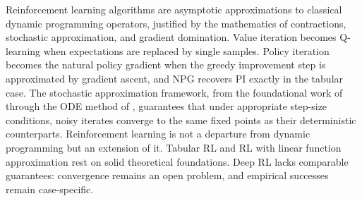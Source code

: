 Reinforcement learning algorithms are asymptotic approximations to classical dynamic programming operators, justified by the mathematics of contractions, stochastic approximation, and gradient domination. Value iteration becomes Q-learning \citep{WatkinsDayan1992, tsitsiklis1994} when expectations are replaced by single samples. Policy iteration becomes the natural policy gradient \citep{Kakade2001, agarwal2021theory} when the greedy improvement step is approximated by gradient ascent, and NPG recovers PI exactly in the tabular case. The stochastic approximation framework, from the foundational work of \citet{Robbins1952} through the ODE method of \citet{borkar2000}, guarantees that under appropriate step-size conditions, noisy iterates converge to the same fixed points as their deterministic counterparts. Reinforcement learning is not a departure from dynamic programming but an extension of it. Tabular RL and RL with linear function approximation rest on solid theoretical foundations. Deep RL lacks comparable guarantees: convergence remains an open problem, and empirical successes remain case-specific.


